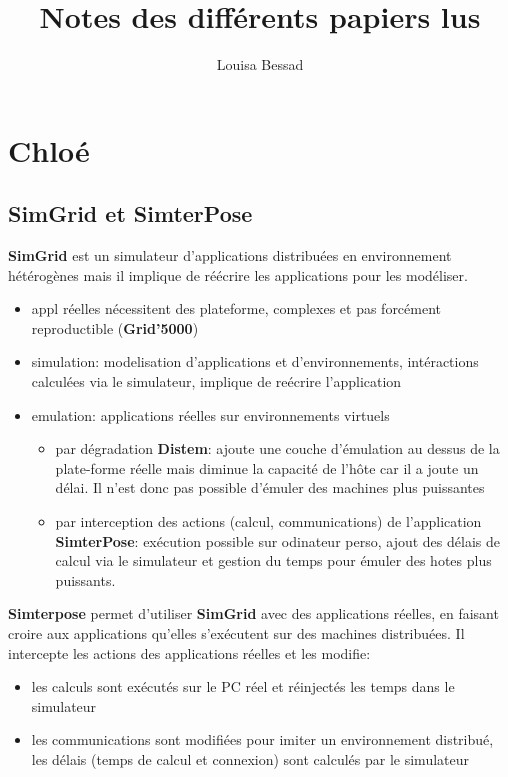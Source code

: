 \documentclass{article}
\title{Notes des différents papiers lus}
\author{Louisa Bessad}
\begin{document}
\maketitle
\tableofcontents
\newpage
\section{Chloé}
\subsection{SimGrid et SimterPose}
\textbf{SimGrid} est un simulateur d'applications distribuées en
environnement hétérogènes mais il implique de réécrire les
applications pour les modéliser.

\begin{itemize}
\item appl réelles nécessitent des plateforme, complexes et pas
  forcément reproductible (\textbf{Grid'5000})
\item simulation: modelisation d'applications et d'environnements,
  intéractions calculées via le simulateur, implique de reécrire
  l'application
\item {\color{red}emulation: applications réelles sur environnements
  virtuels}
\begin{itemize}
\item par dégradation \textbf{Distem}: ajoute une couche d'émulation
  au dessus de la plate-forme réelle mais diminue la capacité de
  l'hôte car il a joute un délai. Il n'est donc pas possible d'émuler
  des machines plus puissantes
\item par interception des actions (calcul, communications) de
  l'application \textbf{SimterPose}: exécution possible sur odinateur
  perso, ajout des délais de calcul via le simulateur et gestion du
  temps pour émuler des hotes plus puissants.
\end{itemize}
\end{itemize}

\textbf{Simterpose} permet d'utiliser \textbf{SimGrid} avec des
applications réelles, en faisant croire aux applications qu'elles
s'exécutent sur des machines distribuées. Il intercepte les actions
des applications réelles et les modifie:
\begin{itemize}
\item les calculs sont exécutés sur le PC réel et réinjectés les temps
  dans le simulateur
\item les communications sont modifiées pour imiter un environnement
  distribué, les délais (temps de calcul et connexion) sont calculés
  par le simulateur
\end{itemize}
\end{document}
